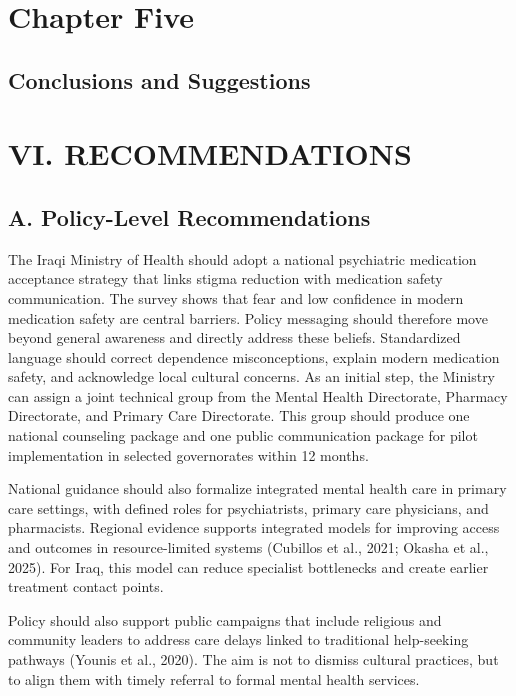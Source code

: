 \section{Chapter Five}\label{chapter-five}

\subsection{Conclusions and
Suggestions}\label{conclusions-and-suggestions}

\section{VI. RECOMMENDATIONS}\label{vi.-recommendations}

\subsection{A. Policy-Level
Recommendations}\label{a.-policy-level-recommendations}

The Iraqi Ministry of Health should adopt a national psychiatric
medication acceptance strategy that links stigma reduction with
medication safety communication. The survey shows that fear and low
confidence in modern medication safety are central barriers. Policy
messaging should therefore move beyond general awareness and directly
address these beliefs. Standardized language should correct dependence
misconceptions, explain modern medication safety, and acknowledge local
cultural concerns. As an initial step, the Ministry can assign a joint
technical group from the Mental Health Directorate, Pharmacy
Directorate, and Primary Care Directorate. This group should produce one
national counseling package and one public communication package for
pilot implementation in selected governorates within 12 months.

National guidance should also formalize integrated mental health care in
primary care settings, with defined roles for psychiatrists, primary
care physicians, and pharmacists. Regional evidence supports integrated
models for improving access and outcomes in resource-limited systems
(Cubillos et al., 2021; Okasha et al., 2025). For Iraq, this model can
reduce specialist bottlenecks and create earlier treatment contact
points.

Policy should also support public campaigns that include religious and
community leaders to address care delays linked to traditional
help-seeking pathways (Younis et al., 2020). The aim is not to dismiss
cultural practices, but to align them with timely referral to formal
mental health services.

